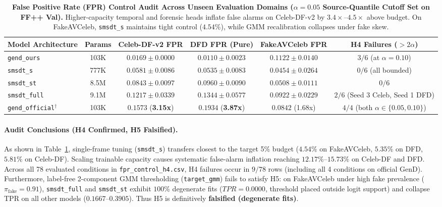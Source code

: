 \begin{table}[t]
\centering
\small
\caption{\textbf{False Positive Rate (FPR) Control Audit Across Unseen Evaluation Domains ($\alpha = 0.05$ Source-Quantile Cutoff Set on FF++ Val).} Higher-capacity temporal and forensic heads inflate false alarms on Celeb-DF-v2 by $3.4\times\text{--}4.5\times$ above budget. On FakeAVCeleb, \texttt{smsdt\_s} maintains tight control ($4.54\%$), while GMM recalibration collapses under fake skew.}
\label{tab:fpr_control}
\begin{tabular}{l c c c c c}
\toprule
\textbf{Model Architecture} & \textbf{Params} & \textbf{Celeb-DF-v2 FPR} & \textbf{DFD FPR (Pure)} & \textbf{FakeAVCeleb FPR} & \textbf{H4 Failures ($>2\alpha$)} \\
\midrule
\texttt{gend\_ours} & 103K & $0.0169 \pm 0.0000$ & $0.0110 \pm 0.0023$ & $0.1122 \pm 0.0140$ & $3 / 6$ (at $\alpha=0.10$) \\
\texttt{smsdt\_s}  & 777K & $0.0581 \pm 0.0086$ & $0.0535 \pm 0.0083$ & $\mathbf{0.0454 \pm 0.0264}$ & $0 / 6$ (all bounded) \\
\texttt{smsdt\_st} & 8.5M & $0.0843 \pm 0.0097$ & $0.0960 \pm 0.0090$ & $0.0508 \pm 0.0111$ & $0 / 6$ \\
\texttt{smsdt\_full} & 9.1M & $0.1217 \pm 0.0339$ & $0.1344 \pm 0.0577$ & $0.0922 \pm 0.0229$ & $2 / 6$ (Seed 3 Celeb, Seed 1 DFD) \\
\midrule
\texttt{gend\_official}$^\dagger$ & 103K & $0.1573$ (\textbf{3.15x}) & $0.1934$ (\textbf{3.87x}) & $0.0842$ (1.68x) & $4 / 4$ (both $\alpha \in \{0.05, 0.10\}$) \\
\bottomrule
\end{tabular}
\end{table}

\paragraph{Audit Conclusions (H4 Confirmed, H5 Falsified).}
As shown in Table~\ref{tab:fpr_control}, single-frame tuning (\texttt{smsdt\_s}) transfers closest to the target 5\% budget ($4.54\%$ on FakeAVCeleb, $5.35\%$ on DFD, $5.81\%$ on Celeb-DF). Scaling trainable capacity causes systematic false-alarm inflation reaching $12.17\%\text{--}15.73\%$ on Celeb-DF and DFD. Across all 78 evaluated conditions in \texttt{fpr\_control\_h4.csv}, H4 failures occur in $9 / 78$ rows (including all 4 conditions on official GenD). Furthermore, label-free 2-component GMM thresholding (\texttt{target\_gmm}) fails to satisfy H5: on FakeAVCeleb under high fake prevalence ($\pi_{\text{fake}} = 0.91$), \texttt{smsdt\_full} and \texttt{smsdt\_st} exhibit $100\%$ degenerate fits ($TPR = 0.0000$, threshold placed outside logit support) and collapse TPR on all other models ($0.1667\text{--}0.3905$). Thus H5 is definitively \textbf{falsified (degenerate fits)}.

